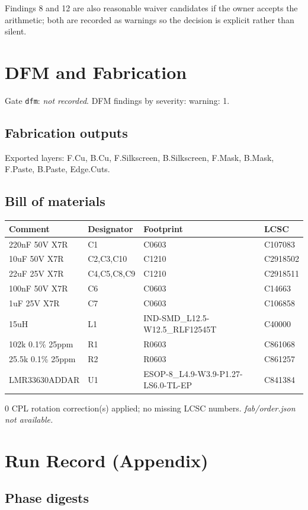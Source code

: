 \documentclass[11pt,a4paper]{article}
\begin{document}
Findings 8 and 12 are also reasonable waiver candidates if the owner accepts the arithmetic; both are recorded as warnings so the decision is explicit rather than silent.

\section{DFM and Fabrication}
Gate \texttt{dfm}: \emph{not recorded}.
DFM findings by severity: warning: 1.
\subsection*{Fabrication outputs}
Exported layers: F.Cu, B.Cu, F.Silkscreen, B.Silkscreen, F.Mask, B.Mask, F.Paste, B.Paste, Edge.Cuts.
\subsection*{Bill of materials}
{\small
\begin{longtable}{p{4.4cm}p{2.8cm}p{4.6cm}l}
\toprule
\textbf{Comment} & \textbf{Designator} & \textbf{Footprint} & \textbf{LCSC} \\
\midrule
\endhead
220nF 50V X7R & C1 & C0603 & C107083 \\
10uF 50V X7R & C2,C3,C10 & C1210 & C2918502 \\
22uF 25V X7R & C4,C5,C8,C9 & C1210 & C2918511 \\
100nF 50V X7R & C6 & C0603 & C14663 \\
1uF 25V X7R & C7 & C0603 & C106858 \\
15uH & L1 & IND-SMD\_L12.5-W12.5\_RLF12545T & C40000 \\
102k 0.1\% 25ppm & R1 & R0603 & C861068 \\
25.5k 0.1\% 25ppm & R2 & R0603 & C861257 \\
LMR33630ADDAR & U1 & ESOP-8\_L4.9-W3.9-P1.27-LS6.0-TL-EP & C841384 \\
\bottomrule
\end{longtable}
}
0 CPL rotation correction(s) applied; no missing LCSC numbers.
\emph{fab/order.json not available.}
\section{Run Record (Appendix)}
\subsection*{Phase digests}
\end{document}
